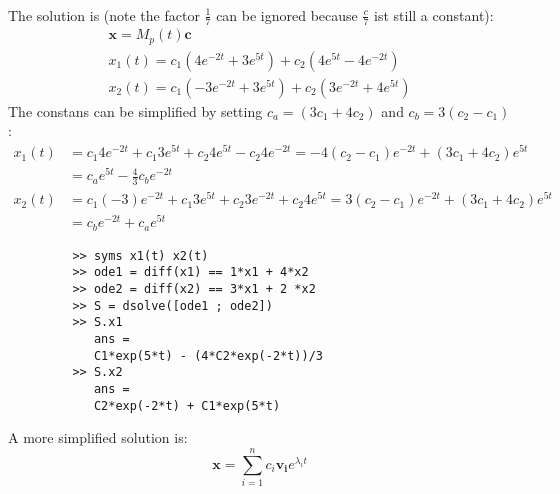 \begin{example}
\begin{gather*}
   \end{gather*}
   The solution is (note the factor \(\frac{1}{7}\) can be ignored because \(\frac{c}{7}\) ist still a constant):
   \begin{gather}
      \bm{x} =  M_p(t) \bm{c} \\
      x_1(t) = c_1 \left( 4 e^{-2t} + 3e^{5t} \right) + c_2 \left(4e^{5t} - 4e^{-2t} \right) \\
      x_2(t) = c_1 \left(-3 e^{-2t} + 3e^{5t} \right) + c_2 \left(3 e^{-2t} + 4 e^{5t} \right)
   \end{gather}
   The constans can be simplified by setting \(c_a = (3c_1 + 4c_2)\) and \( c_b = 3(c_2 - c_1) \):
   \begin{align*}
      x_1(t) & = c_1 4 e^{-2t} + c_1 3e^{5t} + c_2 4 e^{5t} - c_2 4e^{-2t} = -4(c_2 - c_1)e^{-2t}  +  (3c_1 + 4c_2)e^{5t}    \\
             & = c_a e^{5t} - \frac{4}{3} c_b e^{-2t}                                                                        \\
      x_2(t) & = c_1 (-3) e^{-2t} + c_1 3e^{5t}  + c_2 3 e^{-2t} + c_2 4 e^{5t} = 3(c_2 - c_1) e^{-2t} + (3c_1 + 4c_2)e^{5t} \\
             & = c_b e^{-2t} + c_a e^{5t}
   \end{align*}
   \begin{matlab}
      \begin{lstlisting}
         >> syms x1(t) x2(t)
         >> ode1 = diff(x1) == 1*x1 + 4*x2
         >> ode2 = diff(x2) == 3*x1 + 2 *x2
         >> S = dsolve([ode1 ; ode2])
         >> S.x1
            ans = 
            C1*exp(5*t) - (4*C2*exp(-2*t))/3
         >> S.x2
            ans = 
            C2*exp(-2*t) + C1*exp(5*t)
      \end{lstlisting}
   \end{matlab}
\end{example}
A more simplified solution is:
\begin{equation}
   \bm{x} = \sum_{i=1}^{n} c_i \bm{v_i} e^{\lambda_i t}
\end{equation}
